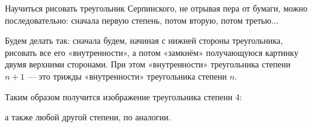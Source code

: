\begin{itemize}
\itC Научиться рисовать треугольник Серпинского, не отрывая пера от бумаги, можно последовательно: сначала первую степень, потом вторую, потом третью...

Будем делать так: сначала будем, начиная с нижней стороны треугольника, рисовать все его «внутренности», а потом «замкнём» \linebreak получающуюся картинку двумя верхними сторонами. При этом \linebreak «внутренности» треугольника степени $n+1$ — это трижды «внутренности» треугольника степени $n$.

Таким образом получится изображение треугольника степени 4:

\begin{center}  \end{center}

а также любой другой степени, по аналогии.
\end{itemize}